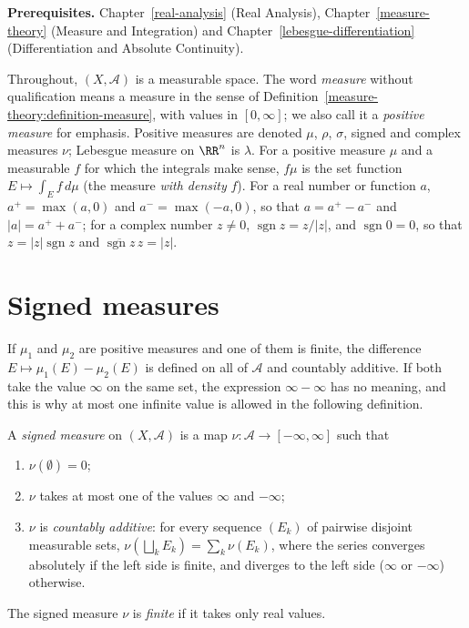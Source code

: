 \noindent\textbf{Prerequisites.} Chapter~\ref{real-analysis} (Real Analysis), Chapter~\ref{measure-theory} (Measure and Integration) and Chapter~\ref{lebesgue-differentiation} (Differentiation and
Absolute Continuity).

\begin{notation}\label{signed-measures:notation-basic}
Throughout, $(X, \mathcal{A})$ is a measurable space. The word \emph{measure} without qualification means a measure in the sense of
Definition~\ref{measure-theory:definition-measure}, with values in $[0, \infty]$; we also call it a \emph{positive measure} for emphasis. Positive measures are denoted $\mu$, $\rho$, $\sigma$, signed and
complex measures $\nu$; Lebesgue measure on $\RR^n$ is $\lambda$. For a positive measure $\mu$ and a measurable $f$ for which the integrals make sense, $f\mu$ is the set function
$E \mapsto \int_Ef\,d\mu$ (the measure \emph{with density} $f$). For a real number or function $a$, $a^+ = \max(a, 0)$ and $a^- = \max(-a, 0)$, so that $a = a^+ - a^-$ and $|a| = a^+ + a^-$; for
a complex number $z \neq 0$, $\operatorname{sgn}z = z/|z|$, and $\operatorname{sgn}0 = 0$, so that $z = |z|\operatorname{sgn}z$ and $\overline{\operatorname{sgn}z}\,z = |z|$.
\end{notation}

\section{Signed measures}\label{signed-measures:section-signed}

If $\mu_1$ and $\mu_2$ are positive measures and one of them is finite, the difference $E \mapsto \mu_1(E) - \mu_2(E)$ is defined on all of $\mathcal{A}$ and countably additive. If both take the value
$\infty$ on the same set, the expression $\infty - \infty$ has no meaning, and this is why at most one infinite value is allowed in the following definition.

\begin{definition}\label{signed-measures:definition-signed-measure}
A \emph{signed measure} on $(X, \mathcal{A})$ is a map $\nu \colon \mathcal{A} \to [-\infty, \infty]$ such that
\begin{enumerate}
\item $\nu(\emptyset) = 0$;
\item $\nu$ takes at most one of the values $\infty$ and $-\infty$;
\item $\nu$ is \emph{countably additive}: for every sequence $(E_k)$ of pairwise disjoint measurable sets, $\nu(\bigsqcup_kE_k) = \sum_k\nu(E_k)$, where the series converges absolutely if the left
side is finite, and diverges to the left side ($\infty$ or $-\infty$) otherwise.
\end{enumerate}
The signed measure $\nu$ is \emph{finite} if it takes only real values.
\end{definition}

